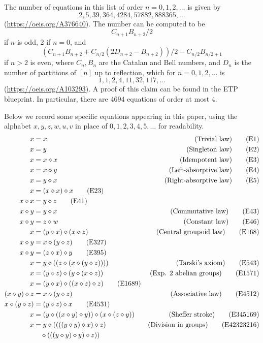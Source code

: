The number of equations in this list of order $n=0,1,2,\dots$ is given by
$$ 2, 5, 39, 364, 4284, 57882, 888365, \dots$$
(\url{https://oeis.org/A376640}).  The number can be computed to be
$$ C_{n+1} B_{n+2}/2$$
if $n$ is odd, $2$ if $n=0$, and
$$ (C_{n+1} B_{n+2}+ C_{n/2}(2D_{n+2}-B_{n+2}))/2 - C_{n/2} B_{n/2+1}$$
if $n > 2$ is even, where $C_n, B_n$ are the Catalan and Bell numbers, and $D_n$ is the number of partitions of $[n]$ up to reflection, which for $n=0,1,2,\dots$ is
$$ 1, 1, 2, 4, 11, 32, 117, \dots$$
(\url{https://oeis.org/A103293}).  A proof of this claim can be found in the ETP blueprint.  In particular, there are $4694$ equations of order at most $4$.

Below we record some specific equations appearing in this paper, using the alphabet $x,y,z,w,u,v$ in place of $0,1,2,3,4,5,\dots$ for readability.
\begin{align}
        x &= x & \hbox{(Trivial law)} \label{eq1}\tag{E1} \\
        x &= y & \hbox{(Singleton law)} \label{eq2}\tag{E2} \\
        x &= x \diamond x & \hbox{(Idempotent law)} \label{eq3}\tag{E3} \\
        x &= x \diamond y & \hbox{(Left-absorptive law)} \label{eq4}\tag{E4} \\
        x &= y \diamond x & \hbox{(Right-absorptive law)} \label{eq5}\tag{E5} \\
        x &= (x \diamond x) \diamond x \label{eq23}\tag{E23} \\
        x \diamond x &= y \diamond z \label{eq41}\tag{E41} \\
        x \diamond y &= y \diamond x & \hbox{(Commutative law)} \label{eq43}\tag{E43} \\
        x \diamond y &= z \diamond w & \hbox{(Constant law)} \label{eq46}\tag{E46} \\
        x &= (y \diamond x) \diamond (x \diamond z) & \hbox{(Central groupoid law)} \label{eq168}\tag{E168} \\
        x \diamond y &= x \diamond (y \diamond z) \label{eq327}\tag{E327} \\
        x \diamond y &= (z \diamond x) \diamond y \label{eq395}\tag{E395} \\
        x &= y \diamond ( (z \diamond (x \diamond (y \diamond z)))) & \hbox{(Tarski's axiom)} \label{eq543}\tag{E543} \\
        x &= (y \diamond z) \diamond (y \diamond (x \diamond z)) & \hbox{(Exp. $2$ abelian groups)} \label{eq1571}\tag{E1571} \\
        x &= (y \diamond x) \diamond ((x \diamond z) \diamond z) \label{eq1689}\tag{E1689} \\
        (x \diamond y) \diamond z &= x \diamond (y \diamond z) &\hbox{(Associative law)} \label{eq4512}\tag{E4512}\\
        x \diamond (y \diamond z) &= (y \diamond z) \diamond x \label{eq4531}\tag{E4531} \\
        x &= (y \diamond ((x \diamond y) \diamond y)) \diamond (x \diamond (z \diamond y)) & \hbox{(Sheffer stroke)} \label{eq345169}\tag{E345169} \\
        x &= y \diamond ((((y \diamond y) \diamond x) \diamond z) & \hbox{(Division in groups)} \label{eq42323216}\tag{E42323216} \\
        & \quad  \diamond (((y \diamond y) \diamond y) \diamond z)) \nonumber
\end{align}

